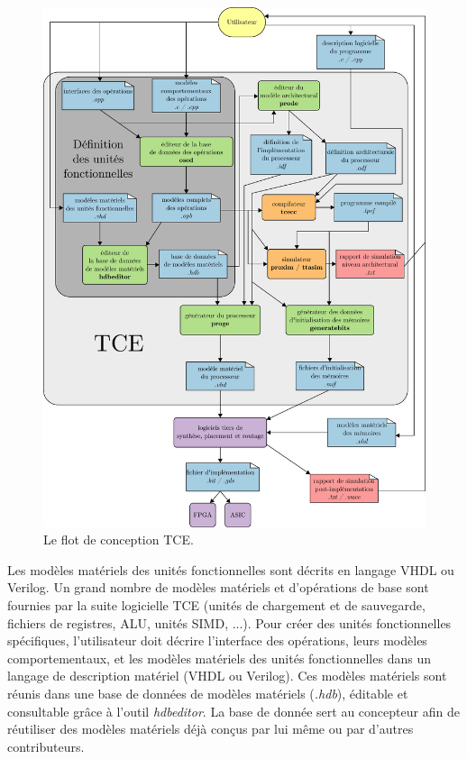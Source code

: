 \begin{figure}[htp]
\centering
\includegraphics[width=\textwidth]{main/ch4_fig/tce}
\caption{Le flot de conception TCE.}
\label{fig:tce}
\end{figure}
Les modèles matériels des unités fonctionnelles sont décrits en langage VHDL ou Verilog. Un grand nombre de modèles matériels et d'opérations de base sont fournies par la suite logicielle TCE (unités de chargement et de sauvegarde, fichiers de registres, ALU, unités SIMD, ...). Pour créer des unités fonctionnelles spécifiques, l'utilisateur doit décrire l'interface des opérations, leurs modèles comportementaux, et les modèles matériels des unités fonctionnelles dans un langage de description matériel (VHDL ou Verilog). Ces modèles matériels sont réunis dans une base de données de modèles matériels (\textit{.hdb}), éditable et consultable grâce à l'outil \textit{hdbeditor}.
La base de donnée sert au concepteur afin de réutiliser des modèles matériels déjà conçus par lui même ou par d'autres contributeurs.

